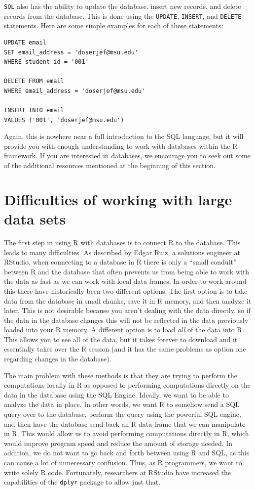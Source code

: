 \documentclass[12pt,oneside]{book}\usepackage[]{graphicx}\usepackage[]{color}
\begin{document}
{{{{\verb+SQL+ also has the ability to update the database, insert new records, and delete records from the database. This is done using the \verb+UPDATE+, \verb+INSERT+, and \verb+DELETE+ statements. Here are some simple examples for each of these statements:

\begin{verbatim}
UPDATE email
SET email_address = 'doserjef@msu.edu'
WHERE student_id = '001'

DELETE FROM email
WHERE email_address = 'doserjef@msu.edu'

INSERT INTO email
VALUES ('001', 'doserjef@msu.edu')
\end{verbatim}

Again, this is nowhere near a full introduction to the SQL language, but it will provide you with enough understanding to work with databases within the R framework. If you are interested in databases, we encourage you to seek out some of the additional resources mentioned at the beginning of this section.

\section{Difficulties of working with large data sets}

The first step in using R with databases is to connect R to the database. This leads to many difficulties. As described by Edgar Ruiz, a solutions engineer at RStudio, when connecting to a database in R there is only a ``small conduit'' between R and the database that often prevents us from being able to work with the data as fast as we can work with local data frames. In order to work around this there have historically been two different options. The first option is to take data from the database in small chunks, save it in R memory, and then analyze it later. This is not desirable because you aren't dealing with the data directly, so if the data in the database changes this will not be reflected in the data previously loaded into your R memory. A different option is to load \emph{all} of the data into R. This allows you to see all of the data, but it takes forever to download and it essentially takes over the R session (and it has the same problems as option one regarding changes in the database). 

The main problem with these methods is that they are trying to perform the computations locally in R as opposed to performing computations directly on the data in the database using the SQL Engine. Ideally, we want to be able to analyze the data in place. In other words, we want R to somehow send a SQL query over to the database, perform the query using the powerful SQL engine, and then have the database send back an R data frame that we can manipulate in R. This would allow us to avoid performing computations directly in R, which would improve program speed and reduce the amount of storage needed. In addition, we do not want to go back and forth between using R and SQL, as this can cause a lot of unnecessary confusion. Thus, as R programmers, we want to write solely R code. Fortunately, researchers at RStudio have increased the capabilities of the \verb+dplyr+ package to allow just that. 

}}}}
\end{document}
